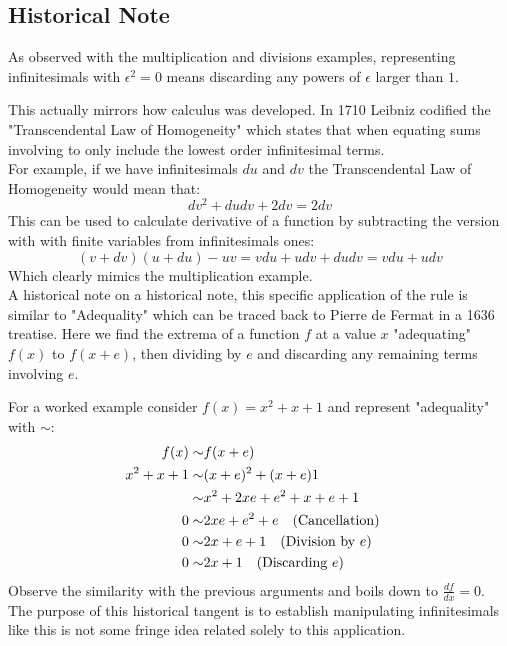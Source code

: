 \subsection{Historical Note}
As observed with the multiplication and divisions examples,
representing infinitesimals with $\epsilon^2 = 0$ means discarding any powers of $\epsilon$ larger than $1$.

This actually mirrors how calculus was developed.
In 1710 Leibniz codified the "Transcendental Law of Homogeneity" which states that when equating sums involving to only include the lowest order infinitesimal terms.
\\

For example,
if we have infinitesimals $du$ and $dv$ the Transcendental Law of Homogeneity would mean that:
\[dv^2+dudv+2dv = 2dv\]
This can be used to calculate derivative of a function by subtracting the version with with finite variables from infinitesimals ones: 
\[(v+dv)(u+du)-uv = vdu+udv+dudv= vdu+udv\]
Which clearly mimics the multiplication example.
\\

A historical note on a historical note,
this specific application of the rule is similar to "Adequality" which can be traced back to Pierre de Fermat in a 1636 treatise.
Here we find the extrema of a function $f$ at a value $x$ "adequating" $f(x)$ to $f(x+e)$, 
then dividing by $e$ and discarding any remaining terms involving $e$.

For a worked example consider $f(x)=x^2+x+1$ and represent "adequality" with $\sim$:
\begin{equation*}
\begin{aligned}
	f(x)\sim&f(x+e)\\
	x^2+x+1\sim& (x+e)^2+(x+e)1\\
	\sim&x^2+2xe+e^2+x+e+1&\\
	0\sim& 2xe+e^2+e \text{\quad (Cancellation)}\\
	0\sim& 2x+e+1 \text{\quad (Division by $e$)}\\
	0\sim& 2x+1 \text{\quad (Discarding $e$)}\\
\end{aligned}
\end{equation*}
Observe the similarity with the previous arguments and boils down to $\frac{df}{dx}=0$.
\\

The purpose of this historical tangent is to establish manipulating infinitesimals like this is not some fringe idea related solely to this application.

